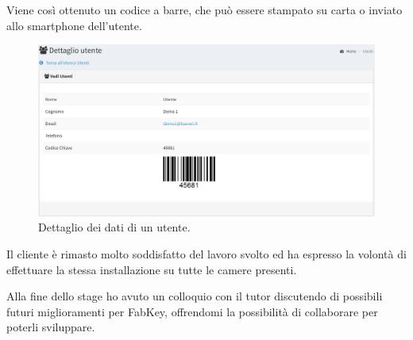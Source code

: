 Viene così ottenuto un codice a barre, che può essere stampato su carta o inviato allo smartphone dell'utente.

\begin{figure}[H]
	\begin{center}
	\includegraphics[scale=0.3]{immagini/utente_barcode.png}
	\caption{Dettaglio dei dati di un utente.}
	\end{center}
\end{figure}

Il cliente è rimasto molto soddisfatto del lavoro svolto ed ha espresso la volontà di effettuare la stessa installazione su tutte le camere presenti.

\medskip

Alla fine dello stage ho avuto un colloquio con il tutor discutendo di possibili futuri miglioramenti per FabKey, offrendomi la possibilità di collaborare per poterli sviluppare.
